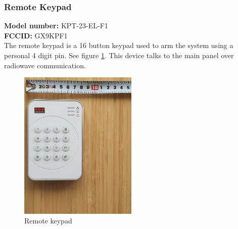 \subsubsection{Remote Keypad}
\textbf{Model number:} KPT-23-EL-F1 \\ %
\textbf{FCCID:} GX9KPF1 \\ %
The remote keypad is a 16 button keypad used to arm the system using a personal 4 digit pin. See figure \ref{fig:remote-keypad}. This device talks to the main panel over radiowave communication.
\begin{figure}[!ht]
  \begin{center}
    \includegraphics[width=0.5\textwidth]{images/keypad.png}
  \end{center}
  \caption{Remote keypad}
  \label{fig:remote-keypad}
\end{figure}

